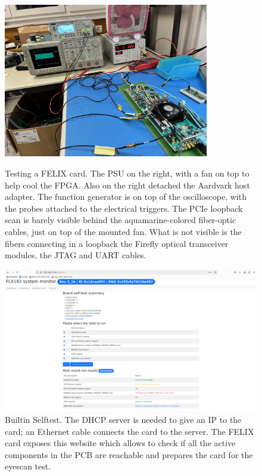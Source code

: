 \clearpage
\begin{figure}[htbp]
\begin{minipage}{0.9\textwidth}
\centering
\includegraphics[width=0.8\textwidth]{images/contributions/felix-card-testing.jpg}
\caption[Visual aid of FELIX card testing]{Testing a FELIX card. The PSU on the right, with a fan on top to help cool the \acs{FPGA}. Also on the right detached the Aardvark host adapter. The function generator is on top of the oscilloscope, with the probes attached to the electrical triggers. The \acs{PCIe} loopback scan is barely visible behind the aquamarine-colored fiber-optic cables, just on top of the mounted fan. What is not visible is the fibers connecting in a loopback the Firefly \protect\cite{firefly-optical-transceiver} optical transceiver modules, the JTAG and UART cables.}
\label{fig:felix-testing}
\end{minipage}\hfill
\begin{minipage}{0.9\textwidth}
\centering
\includegraphics[width=\textwidth]{images/contributions/BIST.png}
\caption[Builtin Selftest screenshot]{Builtin Selftest. The DHCP server is needed to give an IP to the card; an Ethernet cable connects the card to the server. The \acs{FELIX} card exposes this website which allows to check if all the active components in the \acs{PCB} are reachable and prepares the card for the eyescan test.}
\label{fig:bist}
\end{minipage}
\end{figure}


